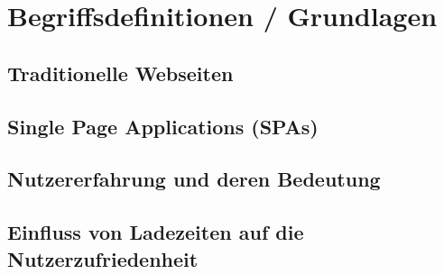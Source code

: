 \section{Begriffsdefinitionen / Grundlagen}
\subsection{Traditionelle Webseiten}
\subsection{Single Page Applications (SPAs)}
\subsection{Nutzererfahrung und deren Bedeutung}
\subsection{Einfluss von Ladezeiten auf die Nutzerzufriedenheit}
